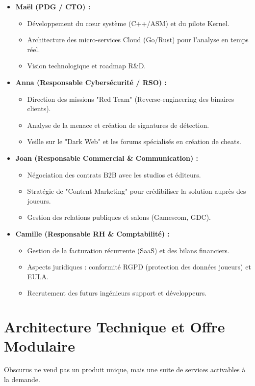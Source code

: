 \documentclass[12pt,a4paper]{article}
\begin{document}
\begin{itemize}[label=\textbullet]
    \item \textbf{Maël (PDG / CTO) :} 
    \begin{itemize}
        \item Développement du cœur système (C++/ASM) et du pilote Kernel.
        \item Architecture des micro-services Cloud (Go/Rust) pour l'analyse en temps réel.
        \item Vision technologique et roadmap R\&D.
    \end{itemize}
    \item \textbf{Anna (Responsable Cybersécurité / RSO) :} 
    \begin{itemize}
        \item Direction des missions "Red Team" (Reverse-engineering des binaires clients).
        \item Analyse de la menace et création de signatures de détection.
        \item Veille sur le "Dark Web" et les forums spécialisés en création de cheats.
    \end{itemize}
    \item \textbf{Joan (Responsable Commercial \& Communication) :} 
    \begin{itemize}
        \item Négociation des contrats B2B avec les studios et éditeurs.
        \item Stratégie de "Content Marketing" pour crédibiliser la solution auprès des joueurs.
        \item Gestion des relations publiques et salons (Gamescom, GDC).
    \end{itemize}
    \item \textbf{Camille (Responsable RH \& Comptabilité) :} 
    \begin{itemize}
        \item Gestion de la facturation récurrente (SaaS) et des bilans financiers.
        \item Aspects juridiques : conformité RGPD (protection des données joueurs) et EULA.
        \item Recrutement des futurs ingénieurs support et développeurs.
    \end{itemize}
\end{itemize}

\section{Architecture Technique et Offre Modulaire}
Obscurus ne vend pas un produit unique, mais une suite de services activables à la demande.
\end{document}
